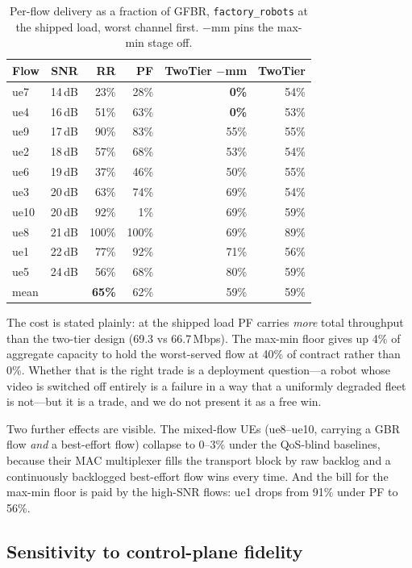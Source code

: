 \documentclass[conference]{IEEEtran}
\begin{document}
\begin{table}[t]
\caption{Per-flow delivery as a fraction of GFBR, \texttt{factory\_robots}
at the shipped load, worst channel first. $-$mm pins the max-min stage off.}
\label{tab:perflow}
\centering
\small
\begin{tabular}{@{}lrrrrr@{}}
\toprule
Flow & SNR & RR & PF & TwoTier $-$mm & \textbf{TwoTier} \\
\midrule
ue7  & 14\,dB & 23\% & 28\% & \textbf{0\%} & 54\% \\
ue4  & 16\,dB & 51\% & 63\% & \textbf{0\%} & 53\% \\
ue9  & 17\,dB & 90\% & 83\% & 55\% & 55\% \\
ue2  & 18\,dB & 57\% & 68\% & 53\% & 54\% \\
ue6  & 19\,dB & 37\% & 46\% & 50\% & 55\% \\
ue3  & 20\,dB & 63\% & 74\% & 69\% & 54\% \\
ue10 & 20\,dB & 92\% & 1\%  & 69\% & 59\% \\
ue8  & 21\,dB & 100\% & 100\% & 69\% & 89\% \\
ue1  & 22\,dB & 77\% & 92\% & 71\% & 56\% \\
ue5  & 24\,dB & 56\% & 68\% & 80\% & 59\% \\
\midrule
mean &        & \textbf{65\%} & 62\% & 59\% & 59\% \\
\bottomrule
\end{tabular}
\end{table}

The cost is stated plainly: at the shipped load PF carries
\emph{more} total throughput than the two-tier design (69.3 vs
66.7\,Mbps). The max-min floor gives up 4\% of aggregate capacity to hold
the worst-served flow at 40\% of contract rather than 0\%. Whether that is
the right trade is a deployment question---a robot whose video is switched
off entirely is a failure in a way that a uniformly degraded fleet is
not---but it is a trade, and we do not present it as a free win.

Two further effects are visible. The mixed-flow UEs (ue8--ue10, carrying a
GBR flow \emph{and} a best-effort flow) collapse to 0--3\% under the
QoS-blind baselines, because their MAC multiplexer fills the transport
block by raw backlog and a continuously backlogged best-effort flow wins
every time. And the bill for the max-min floor is paid by the high-SNR
flows: ue1 drops from 91\% under PF to 56\%.

\subsection{Sensitivity to control-plane fidelity}\label{sec:sensitivity}
\end{document}
